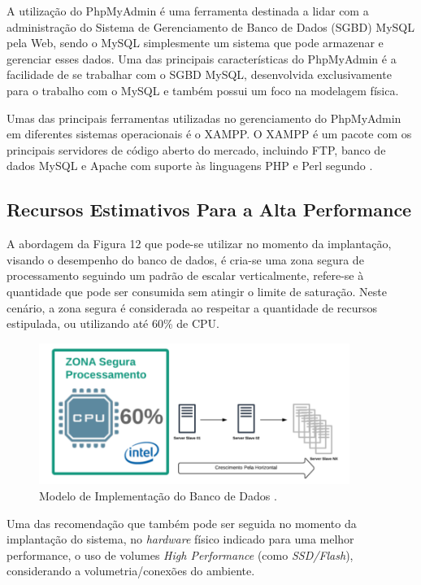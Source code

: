    A utilização do PhpMyAdmin é uma ferramenta destinada a lidar com a administração do Sistema de Gerenciamento de Banco de Dados (SGBD) MySQL pela Web, sendo o MySQL simplesmente um sistema que pode armazenar e gerenciar esses dados. Uma das principais características do PhpMyAdmin é a facilidade de se trabalhar com o SGBD MySQL, desenvolvida exclusivamente para o trabalho com o MySQL e também possui um foco na modelagem física.

   Umas das principais ferramentas utilizadas no gerenciamento do PhpMyAdmin em diferentes sistemas operacionais é o  XAMPP.  O XAMPP é um pacote com os principais servidores de código aberto do mercado, incluindo FTP, banco de dados MySQL e Apache com suporte às linguagens PHP e Perl segundo .   
    
\subsection{Recursos Estimativos Para a Alta Performance}

    A abordagem da Figura 12 que pode-se utilizar no momento da implantação, visando o desempenho do banco de dados, é cria-se uma zona segura de processamento seguindo um padrão de escalar verticalmente, refere-se à quantidade que pode ser consumida sem atingir o limite de saturação. Neste cenário, a zona segura é considerada ao respeitar a quantidade de recursos estipulada, ou utilizando até 60\% de CPU.
   
    \begin{figure}[h]
    \centering
    \includegraphics[width=0.90\textwidth]{./img/segProc.png}
    \caption{Modelo de Implementação do Banco de Dados .}
    \label{fig:segProc}
    \end{figure}

    Uma das recomendação que também pode ser seguida no momento da implantação do sistema, no \textit{hardware} físico indicado para uma melhor performance, o uso de volumes \textit{High Performance} (como \textit{SSD/Flash}), considerando a volumetria/conexões do ambiente.    
    
